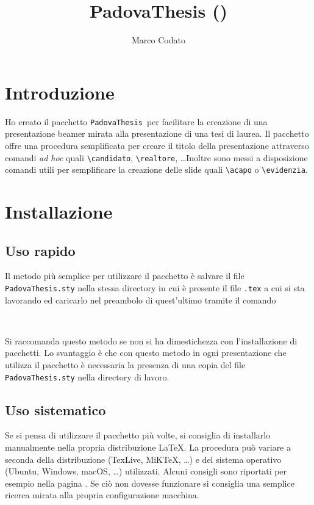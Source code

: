 \documentclass{article}
\title{PadovaThesis (\versione)}
\author{Marco Codato}
\newcommand{\Comando}[1]{\texttt{\textbackslash #1}}
\newcommand{\PadovaThesis}{\texttt{PadovaThesis}}
\begin{document}
\maketitle

\tableofcontents

\section{Introduzione}
Ho creato il pacchetto \PadovaThesis\ per facilitare la creazione di una presentazione beamer mirata alla presentazione di una tesi di laurea. Il pacchetto offre una procedura semplificata per creare il titolo della presentazione attraverso comandi \textit{ad hoc} quali \Comando{candidato}, \Comando{realtore}, \dots Inoltre sono messi a disposizione comandi utili per semplificare la creazione delle slide quali \Comando{acapo} o \Comando{evidenzia}.

\section{Installazione}
\subsection{Uso rapido}
Il metodo più semplice per utilizzare il pacchetto è salvare il file \texttt{PadovaThesis.sty} nella stessa directory in cui è presente il file \texttt{.tex} a cui si sta lavorando ed caricarlo nel preambolo di quest'ultimo tramite il comando
\begin{verbatim}
	
\end{verbatim}
Si raccomanda questo metodo se non si ha dimestichezza con l'installazione di pacchetti. Lo svantaggio è che con questo metodo in ogni presentazione che utilizza il pacchetto è necessaria la presenza di una copia del file \texttt{PadovaThesis.sty} nella directory di lavoro.

\subsection{Uso sistematico}
Se si pensa di utilizzare il pacchetto più volte, si consiglia di installarlo manualmente nella propria distribuzione \LaTeX. La procedura può variare a seconda della distribuzione (TexLive, MiKTeX, \dots) e del sistema operativo (Ubuntu, Windows, macOS, \dots) utilizzati. Alcuni consigli sono riportati per esempio nella pagina \cite{web:wikibooks:install_packages}. Se ciò non dovesse funzionare si consiglia una semplice ricerca mirata alla propria configurazione macchina.
\end{document}
